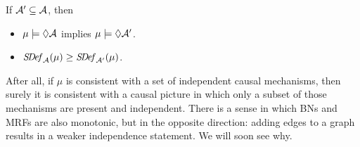 \begin{prop}
        \label{prop:mono}
    If $\mathcal A' \subseteq \mathcal A$,
    then 
    \begin{itemize}[nosep]
    \item 
    $\mu \models \Diamond\mathcal A$ implies $\mu \models \Diamond\mathcal A'$.
    \item 
    $\mathit{S\mskip-3.5muD\mskip-2.5mue\mskip-1.5muf}_{\mathcal A}(\mu) \ge \mathit{S\mskip-3.5muD\mskip-2.5mue\mskip-1.5muf}_{\mathcal A'}(\mu)$.
    \end{itemize}
\end{prop}
%
After all, if 
$\mu$ is consistent with a set of independent causal mechanisms, then surely 
it is
consistent with a causal picture
in which
only a subset of those mechanisms 
are
present and independent.  
{%
There is a sense in which 
    BNs and MRFs are also monotonic,
    but in the opposite direction:
    adding edges to a graph results in a weaker
    independence statement.
    We will soon see why.
}%


